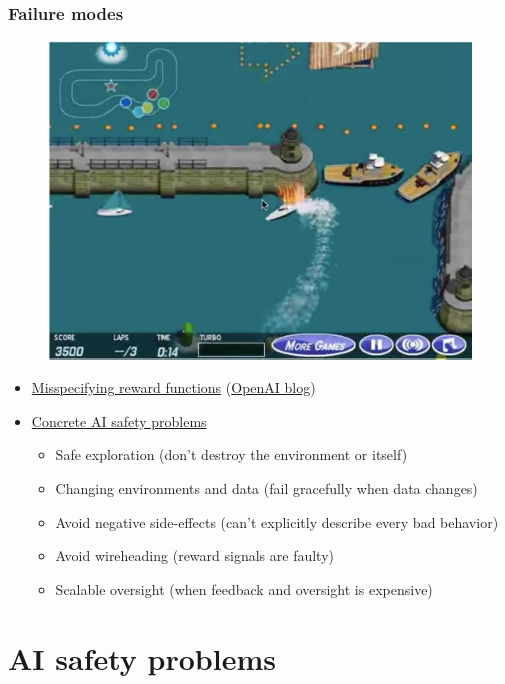 \documentclass{beamer}
\begin{document}
\begin{frame}
  \frametitle{Failure modes}

  \begin{figure}
    \includegraphics[width=0.4\linewidth]{img/coastrunners.png}
  \end{figure}
  \begin{itemize}
    \item \href{https://www.youtube.com/watch?v=tlOIHko8ySg}{Misspecifying reward functions} (\href{https://openai.com/blog/faulty-reward-functions/}{OpenAI blog})
    \item \href{https://openai.com/blog/concrete-ai-safety-problems/}{Concrete AI safety problems}
      \begin{itemize}
        \item Safe exploration (don't destroy the environment or itself)
        \item Changing environments and data (fail gracefully when data changes)
        \item Avoid negative side-effects (can't explicitly describe every bad behavior)
        \item Avoid wireheading (reward signals are faulty)
        \item Scalable oversight (when feedback and oversight is expensive)
      \end{itemize}
  \end{itemize}
\end{frame}

\section{AI safety problems}
\end{document}
